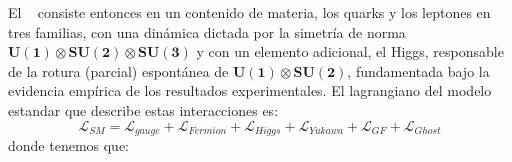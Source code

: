 El \ME ~ consiste entonces en un contenido de materia, los quarks y los leptones en tres familias, con una dinámica dictada por la simetría de norma $\mathbf{U(1) \otimes SU(2) \otimes SU(3)}$ y con un elemento adicional, el Higgs, responsable de la rotura (parcial) espontánea de  $\mathbf{U(1) \otimes SU(2)}$, fundamentada bajo la evidencia empírica de los resultados experimentales. El lagrangiano del modelo estandar que describe estas interacciones es:
\begin{equation}
\mathcal{L}_{SM} = \mathcal{L}_{gauge} + \mathcal{L}_{Fermion} + \mathcal{L}_{Higgs} + \mathcal{L}_{Yukawa} + \mathcal{L}_{GF} + \mathcal{L}_{Ghost} 
\end{equation}
donde tenemos que:

